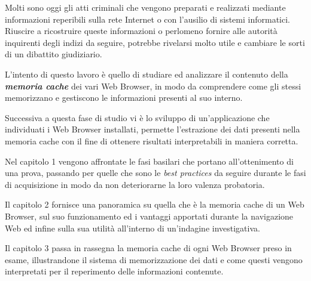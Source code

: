 Molti sono oggi gli atti criminali che vengono preparati e realizzati mediante informazioni reperibili sulla rete Internet o con l'ausilio di sistemi informatici. Riuscire a ricostruire queste informazioni o perlomeno fornire alle autorità inquirenti degli indizi da seguire, potrebbe rivelarsi molto utile e cambiare le sorti di un dibattito giudiziario.

L'intento di questo lavoro è quello di studiare ed analizzare il contenuto della \textbf{\textit{memoria cache}} dei vari Web Browser, in modo da comprendere come gli stessi memorizzano e gestiscono le informazioni presenti al suo interno. 

Successiva a questa fase di studio vi è lo sviluppo di un'applicazione che individuati i Web Browser installati, permette l'estrazione dei dati presenti nella memoria cache con il fine di ottenere risultati interpretabili in maniera corretta.

Nel capitolo 1 vengono affrontate le fasi basilari che portano all'ottenimento di una prova, passando per quelle che sono le \textit{best practices} da seguire durante le fasi di acquisizione in modo da non deteriorarne la loro valenza probatoria. 

Il capitolo 2 fornisce una panoramica su quella che è la memoria cache di un Web Browser, sul suo funzionamento ed i vantaggi apportati durante la navigazione Web ed infine sulla sua utilità all'interno di un'indagine investigativa. 
\clearpage

Il capitolo 3 passa in rassegna la memoria cache di ogni Web Browser preso in esame, illustrandone il sistema di memorizzazione dei dati e come questi vengono interpretati per il reperimento delle informazioni contenute.